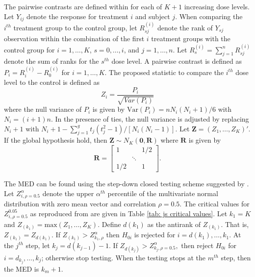 The pairwise contrasts are defined within for each of $K+1$ increasing dose levels. Let $Y_{ij}$ denote the response for treatment $i$ and subject $j$. When comparing the $i^{th}$ treatment group to the control group, let $R_{sj}^{(i)}$ denote the rank of $Y_{sj}$ observation within the combination of the first $i$ treatment groups with the control group for $i = 1, \hdots, K$, $s = 0, \hdots, i$, and $j = 1, \hdots, n$. Let $R_{s}^{(i)} = \sum_{j=1}^n R_{sj}^{(i)}$ denote the sum of ranks for the $s^{th}$ dose level. %
A pairwise contrast is defined as $P_i = R_i^{(i)} - R_0^{(i)}$
for $i=1, \hdots, K.$ The proposed statistic to compare the $i^{th}$ dose level to the control is defined as
\begin{equation}\label{eq: js statistic}
Z_i = \frac{P_i}{\sqrt{Var(P_i)}}
\end{equation}
where the null variance of $P_i$ is given by $\text{Var}(P_i) = nN_i(N_i+1)/6$ with $N_i = (i+1)n.$ In the presence of ties, the null variance is adjusted by replacing $N_i+1$ with $N_i + 1 - \sum_{j=1}^{g}t_j(t_j^2-1)/[N_i(N_i-1)].$ Let $\mathbf{Z} = (Z_1, \hdots, Z_{K})'.$ If the global hypothesis hold, then $\mathbf{Z} \sim N_K(\mathbf{0}, \mathbf{R})$ where $\mathbf{R}$ is given by 
$$\mathbf{R} = \begin{bmatrix}
1 & & 1/2 \\
& \ddots & \\
1/2 & & 1
\end{bmatrix}. $$

The MED can be found using the step-down closed testing scheme suggested by \cite{Tamhane}. Let $Z_{i, \rho = 0.5} ^{\alpha}$ denote the upper $\alpha^{th}$ percentile of the multivariate normal distribution with zero mean vector and correlation $\rho = 0.5$. The critical values for $Z_{i, \rho = 0.5} ^{0.05}$ as reproduced from \cite{tamhane_hochberg_1987} are given in Table \ref{tab: js critical values}. %
Let $k_1=K$ and $Z_{(k_1)} = \text{max}(Z_1, \hdots, Z_K).$ Define $d(k_1)$ as the antirank of $Z_{(k_1)}$. That is, $Z_{(k_1)} = Z_{d(k_1)}.$ If $Z_{(k_1)} > Z_{k_1, \rho}^{\alpha}$ then $H_{0i}$ is rejected for $i = d(k_1), \hdots, k_1$. %
At the $j^{th}$ step, let $k_j = d(k_{j-1}) -1.$ If $Z_{d(k_j)} > Z_{k_j, \rho=0.5}^{\alpha},$ then reject $H_{0i}$ for $i=d_{k_j}, \hdots, k_j$; otherwise stop testing. When the testing stops at the $m^{th}$ step, then the MED is $k_m+1$.


